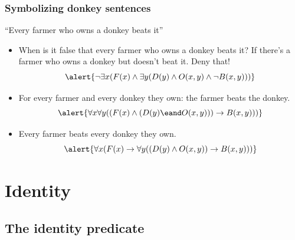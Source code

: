 \begin{frame}
    \frametitle{Symbolizing donkey sentences}

``Every farmer who owns a donkey beats it''\pauses

\begin{itemize}[<+->]
\item When is it false that every farmer who owns a donkey beats it? \pauses
If there's a farmer who owns a donkey but doesn't beat it. Deny that! \pauses
\[
\alert{\lnot\exists x(F(x) \land \exists y(D(y) \land O(x, y) \land \lnot B(x, y)))}
\]
\item For every farmer and every donkey they own: the farmer beats the donkey.
\[
\alert{\forall x\forall y((F(x) \land (D(y) \eand O(x, y))) \to B(x, y)))}
\]
\item Every farmer beats every donkey they own.
\[
\alert{\forall x(F(x) \to \forall y((D(y) \land O(x, y)) \to B(x, y)))}
\]
\end{itemize}
\end{frame}

\newhourlecture
\newonlinelecture

\section{Identity}
\subsection{The identity predicate}

